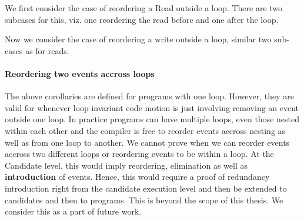             We first consider the case of reordering a Read outside a loop. There are two subcases for this, viz. one reordering the read before and one after the loop. 
                        

            Now we consider the case of reordering a write outside a loop, similar two sub-cases as for reads.           
            

            

            \paragraph{Reordering two events accross loops} 
            
            The above corollaries are defined for programs with one loop. 
            However, they are valid for whenever loop invariant code motion is just involving removing an event outside one loop. 
            In practice programs can have multiple loops, even those nested within each other and the compiler is free to reorder events accross nesting as well as from one loop to another.
            We cannot prove when we can reorder events accross two different loops or reordering events to be within a loop.
            At the Candidate level, this would imply reordering, elimination as well as \textbf{introduction} of events. 
            Hence, this would require a proof of redundancy introduction right from the candidate execution level and then be extended to candidates and then to programs. 
            This is beyond the scope of this thesis. We consider this as a part of future work. 